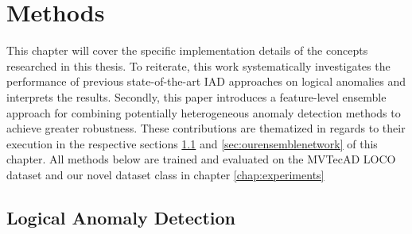 \chapter{Methods}
\label{chap:method}

This chapter will cover the specific implementation details of the concepts researched in this thesis. To reiterate, this work systematically investigates the performance of previous state-of-the-art IAD approaches on logical anomalies and interprets the results. Secondly, this paper introduces a feature-level ensemble approach for combining potentially heterogeneous anomaly detection methods to achieve greater robustness. 
These contributions 
are thematized in regards to their execution in the respective sections \ref{sec:lcocsurveymethods} and \ref{sec:ourensemblenetwork} of this chapter. All methods below are 
trained and evaluated on the MVTecAD LOCO dataset and our novel dataset class in chapter \ref{chap:experiments}


\section{Logical Anomaly Detection}
\label{sec:lcocsurveymethods}

